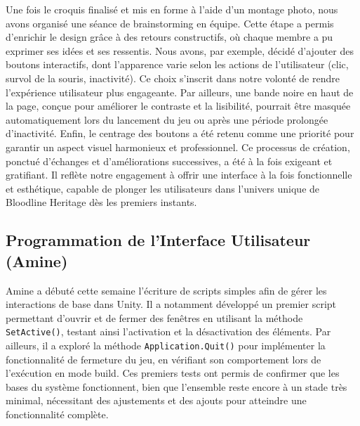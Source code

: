 \documentclass{report}
\begin{document}
Une fois le croquis finalisé et mis en forme à l’aide d’un montage photo, nous avons organisé une séance de brainstorming en équipe. Cette étape a permis d’enrichir le design grâce à des retours constructifs, où chaque membre a pu exprimer ses idées et ses ressentis. Nous avons, par exemple, décidé d’ajouter des boutons interactifs, dont l’apparence varie selon les actions de l’utilisateur (clic, survol de la souris, inactivité). Ce choix s’inscrit dans notre volonté de rendre l’expérience utilisateur plus engageante. Par ailleurs, une bande noire en haut de la page, conçue pour améliorer le contraste et la lisibilité, pourrait être masquée automatiquement lors du lancement du jeu ou après une période prolongée d’inactivité. Enfin, le centrage des boutons a été retenu comme une priorité pour garantir un aspect visuel harmonieux et professionnel. Ce processus de création, ponctué d'échanges et d'améliorations successives, a été à la fois exigeant et gratifiant. Il reflète notre engagement à offrir une interface à la fois fonctionnelle et esthétique, capable de plonger les utilisateurs dans l'univers unique de Bloodline Heritage dès les premiers instants.



\subsection*{Programmation de l'Interface Utilisateur (Amine)}
Amine a débuté cette semaine l’écriture de scripts simples afin de gérer les interactions de base dans Unity. Il a notamment développé un premier script permettant d’ouvrir et de fermer des fenêtres en utilisant la méthode \texttt{SetActive()}, testant ainsi l’activation et la désactivation des éléments. Par ailleurs, il a exploré la méthode \texttt{Application.Quit()} pour implémenter la fonctionnalité de fermeture du jeu, en vérifiant son comportement lors de l'exécution en mode build. Ces premiers tests ont permis de confirmer que les bases du système fonctionnent, bien que l’ensemble reste encore à un stade très minimal, nécessitant des ajustements et des ajouts pour atteindre une fonctionnalité complète.

\newpage %
\end{document}
